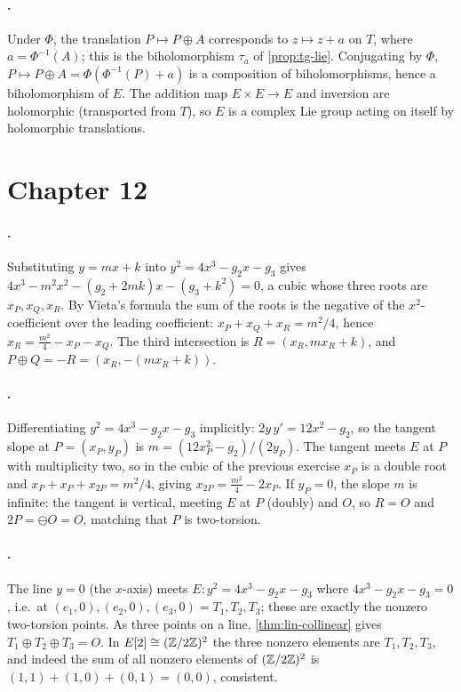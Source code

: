 \paragraph{.}
Under \(\Phi\), the translation \(P \mapsto P \oplus A\) corresponds to
\(z \mapsto z + a\) on \(T\), where \(a = \Phi^{-1}(A)\); this is the biholomorphism
\(\tau_a\) of \cref{prop:tg-lie}. Conjugating by \(\Phi\),
\(P \mapsto P \oplus A = \Phi(\Phi^{-1}(P) + a)\) is a composition of
biholomorphisms, hence a biholomorphism of \(E\). The addition map \(E \times E \to
E\) and inversion are holomorphic (transported from \(T\)), so \(E\) is a complex
Lie group acting on itself by holomorphic translations.

\section{Chapter 12}
\label{sec:soln-ch12}

\paragraph{.}
Substituting \(y = mx + k\) into \(y^2 = 4x^3 - g_2 x - g_3\) gives
\(4x^3 - m^2 x^2 - (g_2 + 2mk)x - (g_3 + k^2) = 0\), a cubic whose three roots are
\(x_P, x_Q, x_R\). By Vieta's formula the sum of the roots is the negative of the
\(x^2\)-coefficient over the leading coefficient: \(x_P + x_Q + x_R = m^2/4\),
hence \(x_R = \tfrac{m^2}{4} - x_P - x_Q\). The third intersection is
\(R = (x_R, m x_R + k)\), and \(P \oplus Q = -R = (x_R, -(m x_R + k))\).

\paragraph{.}
Differentiating \(y^2 = 4x^3 - g_2 x - g_3\) implicitly: \(2y\,y' = 12x^2 - g_2\),
so the tangent slope at \(P = (x_P, y_P)\) is \(m = (12 x_P^2 - g_2)/(2 y_P)\). The
tangent meets \(E\) at \(P\) with multiplicity two, so in the cubic of the previous
exercise \(x_P\) is a double root and \(x_P + x_P + x_{2P} = m^2/4\), giving
\(x_{2P} = \tfrac{m^2}{4} - 2x_P\). If \(y_P = 0\), the slope \(m\) is infinite:
the tangent is vertical, meeting \(E\) at \(P\) (doubly) and \(O\), so
\(R = O\) and \(2P = \ominus O = O\), matching that \(P\) is two-torsion.

\paragraph{.}
The line \(y = 0\) (the \(x\)-axis) meets \(E : y^2 = 4x^3 - g_2 x - g_3\) where
\(4x^3 - g_2 x - g_3 = 0\), i.e.\ at \((e_1,0), (e_2,0), (e_3,0) = T_1, T_2, T_3\);
these are exactly the nonzero two-torsion points. As three points on a line,
\cref{thm:lin-collinear} gives \(T_1 \oplus T_2 \oplus T_3 = O\). In
\(E[2] \cong (\mathbb{Z}/2\mathbb{Z})^2\) the three nonzero elements are \(T_1, T_2, T_3\), and
indeed the sum of all nonzero elements of \((\mathbb{Z}/2\mathbb{Z})^2\) is \((1,1)+(1,0)+(0,1) =
(0,0)\), consistent.

